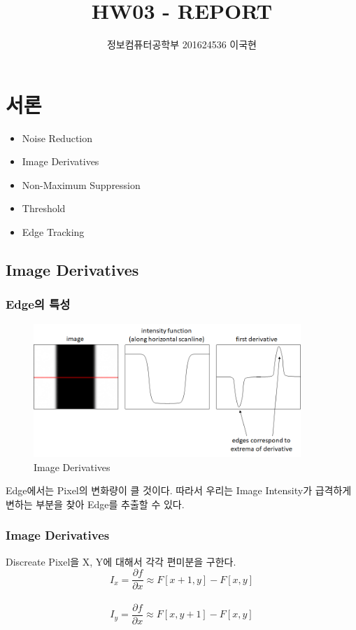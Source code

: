 \documentclass[]{report}
\title{HW03 - REPORT}
\author{정보컴퓨터공학부 201624536 이국현}
\begin{document}
	\maketitle
	
	
\chapter{서론}
\begin{itemize}
	\item Noise Reduction
	\item Image Derivatives
	\item Non-Maximum Suppression
	\item Threshold
	\item Edge Tracking
\end{itemize} 

\section{Image Derivatives}

\subsection{Edge의 특성}

\begin{figure}[ht!]
	\centering
	\includegraphics[width=0.9\textwidth]{image/1-1.png}
	\caption{Image Derivatives}
	\label{1-1}
\end{figure}

Edge에서는 Pixel의 변화량이 클 것이다. 따라서 우리는 Image Intensity가 급격하게 변하는 부분을 찾아 Edge를 추출할 수 있다. \\

\subsection{Image Derivatives}
Discreate Pixel을 X, Y에 대해서 각각 편미분을 구한다. \\
\[ I_x = \frac{\partial f}{\partial x} \approx F[x+1, y] - F[x, y] \] \\
\[ I_y = \frac{\partial f}{\partial x} \approx F[x, y+1] - F[x, y] \] \\
\end{document}
